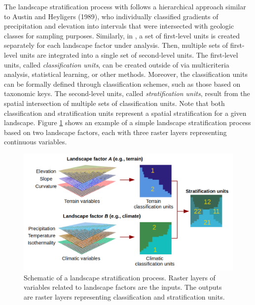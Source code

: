 The landscape stratification process with  follows a hierarchical
approach similar to Austin and Heyligers (1989), who individually classified gradients of
precipitation and elevation into intervals that were intersected with geologic
classes for sampling purposes. Similarly, in , a set of first-level
units is created separately for each landscape factor under analysis. Then,
multiple sets of first-level units are integrated into a single set of
second-level units. The first-level units, called \emph{classification units}, can be
created outside of  via multicriteria analysis, statistical
learning, or other methods. Moreover, the classification units can be formally
defined through classification schemes, such as those based on taxonomic keys.
The second-level units, called \emph{stratification units}, result from the spatial
intersection of multiple sets of classification units. Note that both
classification and stratification units represent a spatial stratification for a
given landscape. Figure \ref{fig:f2} shows an example of a simple landscape
stratification process based on two landscape factors, each with three raster
layers representing continuous variables.

\begin{figure}[H]

{\centering \includegraphics[width=0.8\linewidth,height=0.25\textheight]{figures/figure_2} 

}

\caption{Schematic of a landscape stratification process. Raster layers of variables related to landscape factors are the inputs. The outputs are raster layers representing classification and stratification units.}\label{fig:f2}
\end{figure}

